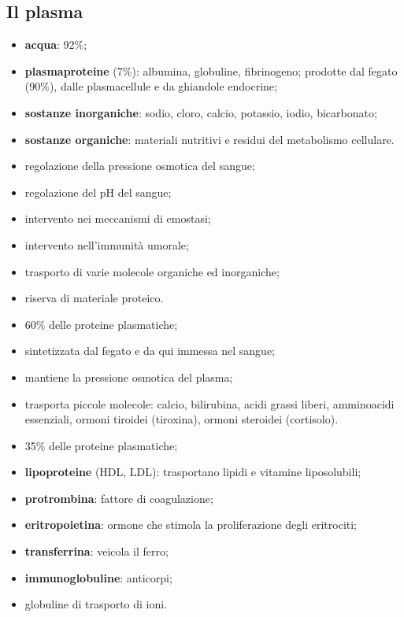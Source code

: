 \subsection{Il plasma}

\begin{itemize}
  \item \textbf{acqua}: 92\%;
  \item \textbf{plasmaproteine} (7\%): albumina, globuline, fibrinogeno; prodotte dal fegato (90\%), dalle plasmacellule e da ghiandole endocrine;
  \item \textbf{sostanze inorganiche}: sodio, cloro, calcio, potassio, iodio, bicarbonato;
  \item \textbf{sostanze organiche}: materiali nutritivi e residui del metabolismo cellulare.
\end{itemize}

\begin{itemize}
  \item regolazione della pressione osmotica del sangue;
  \item regolazione del pH del sangue;
  \item intervento nei meccanismi di emostasi;
  \item intervento nell'immunità umorale;
  \item trasporto di varie molecole organiche ed inorganiche;
  \item riserva di materiale proteico.
\end{itemize}

\begin{itemize}
  \item 60\% delle proteine plasmatiche;
  \item sintetizzata dal fegato e da qui immessa nel sangue;
  \item mantiene la pressione osmotica del plasma;
  \item trasporta piccole molecole: calcio, bilirubina, acidi grassi liberi, amminoacidi essenziali, ormoni tiroidei (tiroxina), ormoni steroidei (cortisolo).
\end{itemize}

\begin{itemize}
  \item 35\% delle proteine plasmatiche;
  \item \textbf{lipoproteine} (HDL, LDL): trasportano lipidi e vitamine liposolubili;
  \item \textbf{protrombina}: fattore di coagulazione;
  \item \textbf{eritropoietina}: ormone che stimola la proliferazione degli eritrociti;
  \item \textbf{transferrina}: veicola il ferro;
  \item \textbf{immunoglobuline}: anticorpi;
  \item globuline di trasporto di ioni.
\end{itemize}

